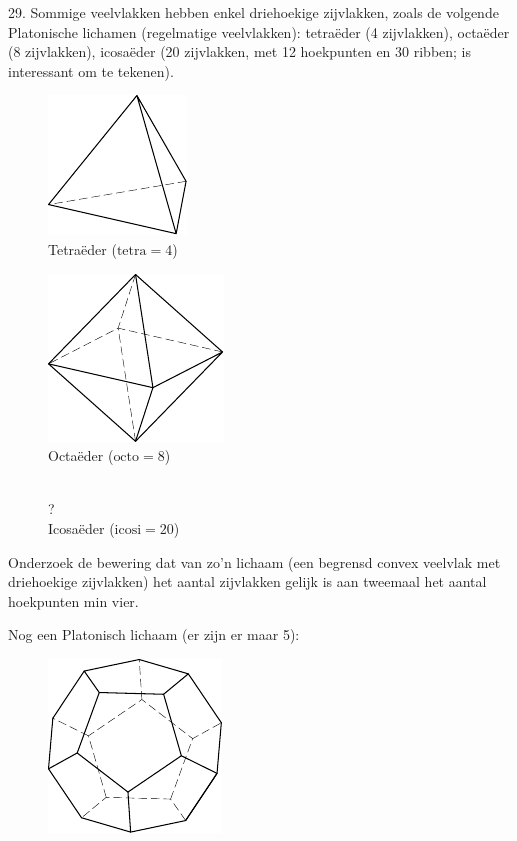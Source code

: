 \begin{problem}{29.}
	Sommige veelvlakken hebben enkel driehoekige zijvlakken, zoals de volgende Platonische lichamen (regelmatige veelvlakken): tetraëder (4 zijvlakken), octaëder (8 zijvlakken), icosaëder (20 zijvlakken, met 12 hoekpunten en 30 ribben; is interessant om te tekenen).
	\begin{figure}
		\footnotesize
		\null\hfill
		\parbox{0.3\linewidth}{\centering\includegraphics{resources/taskbook-131}\\Tetraëder ($\text{tetra} = 4$)}
		\hfill
		\parbox{0.3\linewidth}{\centering\includegraphics{resources/taskbook-132}\\Octaëder ($\text{octo} = 8$)}
		\hfill\null\\
		{\Huge ?}\\Icosaëder ($\text{icosi} = 20$)
	\end{figure}
	Onderzoek de bewering dat van zo'n lichaam (een begrensd convex veelvlak met driehoekige zijvlakken) het aantal zijvlakken gelijk is aan tweemaal het aantal hoekpunten min vier.
\end{problem}

\clearpage

Nog een Platonisch lichaam (er zijn er maar 5):
\begin{figure}
	\includegraphics{resources/taskbook-14}
\end{figure}


